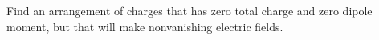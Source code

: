 Find an arrangement of charges that has zero total charge and
        zero dipole moment, but that will make nonvanishing electric fields.
